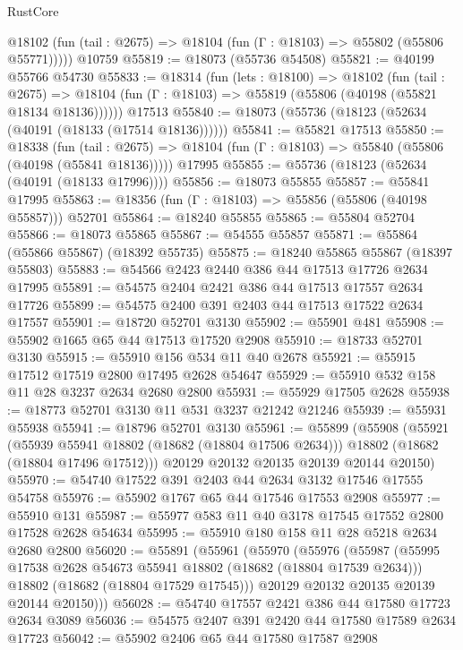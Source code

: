 \begin{lexlean}{RustCore}
\begin{coremodule}
      @18102 (fun (tail : @2675) => @18104 (fun (Γ : @18103) => @55802 (@55806 @55771)))))
    @10759
@55819 := @18073 (@55736 @54508)
@55821 := @40199 @55766 @54730
@55833 := @18314
    (fun (lets : @18100) =>
    @18102
      (fun (tail : @2675) =>
      @18104 (fun (Γ : @18103) => @55819 (@55806 (@40198 (@55821 @18134 @18136))))))
    @17513
@55840 := @18073 (@55736 (@18123 (@52634 (@40191 (@18133 (@17514 @18136))))))
@55841 := @55821 @17513
@55850 := @18338
    (fun (tail : @2675) => @18104 (fun (Γ : @18103) => @55840 (@55806 (@40198 (@55841 @18136)))))
    @17995
@55855 := @55736 (@18123 (@52634 (@40191 (@18133 @17996))))
@55856 := @18073 @55855
@55857 := @55841 @17995
@55863 := @18356 (fun (Γ : @18103) => @55856 (@55806 (@40198 @55857))) @52701
@55864 := @18240 @55855
@55865 := @55804 @52704
@55866 := @18073 @55865
@55867 := @54555 @55857
@55871 := @55864 (@55866 @55867) (@18392 @55735)
@55875 := @18240 @55865 @55867 (@18397 @55803)
@55883 := @54566 @2423 @2440 @386 @44 @17513 @17726 @2634 @17995
@55891 := @54575 @2404 @2421 @386 @44 @17513 @17557 @2634 @17726
@55899 := @54575 @2400 @391 @2403 @44 @17513 @17522 @2634 @17557
@55901 := @18720 @52701 @3130
@55902 := @55901 @481
@55908 := @55902 @1665 @65 @44 @17513 @17520 @2908
@55910 := @18733 @52701 @3130
@55915 := @55910 @156 @534 @11 @40 @2678
@55921 := @55915 @17512 @17519 @2800 @17495 @2628 @54647
@55929 := @55910 @532 @158 @11 @28 @3237 @2634 @2680 @2800
@55931 := @55929 @17505 @2628
@55938 := @18773 @52701 @3130 @11 @531 @3237 @21242 @21246
@55939 := @55931 @55938
@55941 := @18796 @52701 @3130
@55961 := @55899
    (@55908
      (@55921
        (@55939 @55941 @18802 (@18682 (@18804 @17506 @2634)))
        @18802
        (@18682 (@18804 @17496 @17512)))
      @20129
      @20132
      @20135
      @20139
      @20144
      @20150)
@55970 := @54740 @17522 @391 @2403 @44 @2634 @3132 @17546 @17555 @54758
@55976 := @55902 @1767 @65 @44 @17546 @17553 @2908
@55977 := @55910 @131
@55987 := @55977 @583 @11 @40 @3178 @17545 @17552 @2800 @17528 @2628 @54634
@55995 := @55910 @180 @158 @11 @28 @5218 @2634 @2680 @2800
@56020 := @55891
    (@55961
      (@55970
        (@55976
          (@55987
            (@55995 @17538 @2628 @54673 @55941 @18802 (@18682 (@18804 @17539 @2634)))
            @18802
            (@18682 (@18804 @17529 @17545)))
          @20129
          @20132
          @20135
          @20139
          @20144
          @20150)))
@56028 := @54740 @17557 @2421 @386 @44 @17580 @17723 @2634 @3089
@56036 := @54575 @2407 @391 @2420 @44 @17580 @17589 @2634 @17723
@56042 := @55902 @2406 @65 @44 @17580 @17587 @2908

\end{coremodule}
\end{lexlean}
